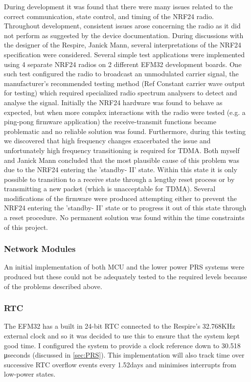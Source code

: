 During development it was found that there were many issues related to the correct
communication, state control, and timing of the \ac{NRF24} radio. Throughout development, consistent
issues arose concerning the radio as it did not perform as suggested by the device documentation.
During discussions with the designer of the Respire, Janick Mann, several interpretations of the
NRF24 specification were considered. Several simple test applications were implemented using 4
separate \ac{NRF24} radios on 2 different EFM32 development boards. One such test configured the
radio to broadcast an unmodulated carrier signal, the manufacturer’s recommended testing method
(Ref Constant carrier wave output for testing) which required specialized radio spectrum analysers
to detect and analyse the signal. Initially the \ac{NRF24} hardware was found to behave as expected, but
when more complex interactions with the radio were tested (e.g. a ping-pong firmware application)
the receive-transmit functions became problematic and no reliable solution was found.
Furthermore, during this testing we discovered that high frequency changes exacerbated the issue
and unfortunately high frequency transitioning is required for \ac{TDMA}. Both myself and Janick Mann
concluded that the most plausible cause of this problem was due to the \ac{NRF24} entering the
'standby- II' state. Within this state it is only possible to transition to a receive state through a
lengthy reset process or by transmitting a new packet (which is unacceptable for \ac{TDMA}). Several
modifications of the firmware were produced attempting either to prevent the \ac{NRF24} entering the
'standby- II' state or to progress it out of this state through a reset procedure. No permanent
solution was found within the time constraints of this project.


\subsubsection{Network Modules}
An initial implementation of both \ac{MCU} and the lower power \ac{PRS} systems were produced but these
could not be adequately tested to the required levels because of the problems described above.


\subsubsection{\acf{RTC}}
The EFM32 has a built in 24-bit \ac{RTC} connected to the Respire’s 32.768KHz external
clock and so it was decided to use this to ensure that the system kept good time. I configured the
system to provide a clock reference down to 30.518 μseconds (discussed in \ref{sec:PRS}). This
implementation will also track time over successive RTC overflow events every 1.52days and
minimises interrupts from low-power states.


